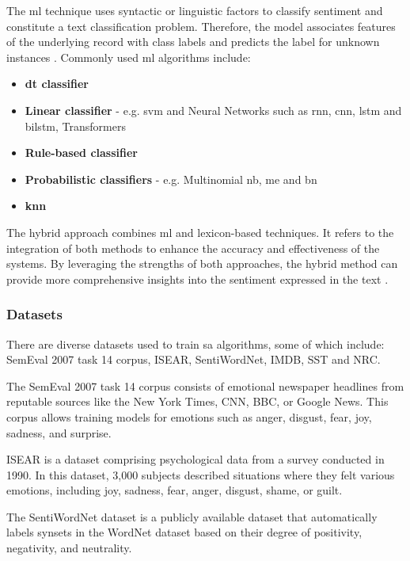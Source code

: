 \documentclass[a4paper,fleqn]{cas-dc}
\begin{document}
The \gls{ml} technique uses syntactic or linguistic factors to classify sentiment and constitute a text classification problem. Therefore, the model associates features of the underlying record with class labels and predicts the label for unknown instances \cite{kaur_survey_2017}. Commonly used \gls{ml} algorithms include:

\begin{itemize}
	\item \textbf{\gls{dt} classifier}
	\item \textbf{Linear classifier} - e.g. \gls{svm} and Neural Networks such as \gls{rnn}, \gls{cnn}, \gls{lstm} and \gls{bilstm}, Transformers
	\item \textbf{Rule-based classifier} 
	\item \textbf{Probabilistic classifiers} - e.g. Multinomial \gls{nb}, \gls{me} and \gls{bn}
	\item \textbf{\gls{knn}}
\end{itemize}

The hybrid approach combines \gls{ml} and lexicon-based techniques. It refers to the integration of both methods to enhance the accuracy and effectiveness of the systems. By leveraging the strengths of both approaches, the hybrid method can provide more comprehensive insights into the sentiment expressed in the text  \cite{wankhade_survey_2022}.

\subsubsection{Datasets}

There are diverse datasets used to train \gls{sa} algorithms, some of which include: SemEval 2007 task 14 corpus, ISEAR, SentiWordNet, IMDB, SST and NRC.

The SemEval 2007 task 14 corpus \cite{strapparava_learning_2008} consists of emotional newspaper headlines from reputable sources like the New York Times, CNN, BBC, or Google News. This corpus allows training models for emotions such as anger, disgust, fear, joy, sadness, and surprise.

ISEAR \cite{ISEAR} is a dataset comprising psychological data from a survey conducted in 1990. In this dataset, 3,000 subjects described situations where they felt various emotions, including joy, sadness, fear, anger, disgust, shame, or guilt.

The SentiWordNet dataset \cite{baccianella_sentiwordnet_2010} is a publicly available dataset that automatically labels synsets in the WordNet dataset based on their degree of positivity, negativity, and neutrality.
\end{document}

